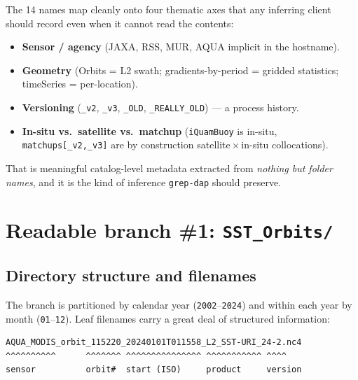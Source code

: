 \documentclass[11pt]{article}
\begin{document}
The 14 names map cleanly onto four thematic axes that any inferring
client should record even when it cannot read the contents:
\begin{itemize}
  \item \textbf{Sensor / agency} (JAXA, RSS, MUR, AQUA implicit in
    the hostname).
  \item \textbf{Geometry} (Orbits = L2 swath; gradients-by-period =
    gridded statistics; timeSeries = per-location).
  \item \textbf{Versioning} (\texttt{\_v2}, \texttt{\_v3},
    \texttt{\_OLD}, \texttt{\_REALLY\_OLD}) --- a process history.
  \item \textbf{In-situ vs.\ satellite vs.\ matchup}
    (\texttt{iQuamBuoy} is in-situ, \texttt{matchups[\_v2,\_v3]}
    are by construction satellite\,$\times$\,in-situ collocations).
\end{itemize}

That is meaningful catalog-level metadata extracted from
\emph{nothing but folder names}, and it is the kind of inference
\texttt{grep-dap} should preserve.

\section{Readable branch \#1: \texttt{SST\_Orbits/}}\label{sec:sstorbits}

\subsection{Directory structure and filenames}

The branch is partitioned by calendar year (\texttt{2002}--\texttt{2024})
and within each year by month (\texttt{01}--\texttt{12}). Leaf
filenames carry a great deal of structured information:

\begin{lstlisting}
AQUA_MODIS_orbit_115220_20240101T011558_L2_SST-URI_24-2.nc4
^^^^^^^^^^      ^^^^^^^ ^^^^^^^^^^^^^^^ ^^^^^^^^^^^ ^^^^
sensor          orbit#  start (ISO)     product     version
\end{lstlisting}
\end{document}
